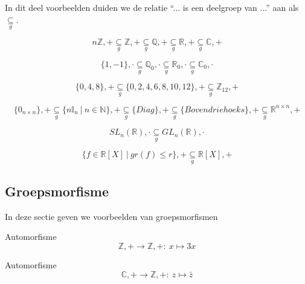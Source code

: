 \documentclass[main.tex]{subfiles}
\begin{document}
In dit deel voorbeelden duiden we de relatie ``... is een deelgroep van ...'' aan als $\underset{g}{\subseteq}$.

\begin{vb}
  \[ n\mathbb{Z},+ \underset{g}{\subseteq} \mathbb{Z},+ \underset{g}{\subseteq} \mathbb{Q},+ \underset{g}{\subseteq} \mathbb{R},+ \underset{g}{\subseteq} \mathbb{C},+ \]
\end{vb}

\begin{vb}
  \[ \{ 1,-1\},\cdot \underset{g}{\subseteq} \mathbb{Q}_{0},\cdot \underset{g}{\subseteq} \mathbb{R}_{0},\cdot \underset{g}{\subseteq} \mathbb{C}_{0},\cdot \]
\end{vb}

\begin{vb}
  \[ \{ 0,4,8\},+ \underset{g}{\subseteq} \{ 0,2,4,6,8,10,12\},+ \underset{g}{\subseteq} \mathbb{Z}_{12},+ \]
\end{vb}

\begin{vb}
  \[ \{0_{n\times n}\},+ \underset{g}{\subseteq} \{ n\mathbb{I}_{n} \ |\ n \in \mathbb{N} \},+ \underset{g}{\subseteq} \{ Diag \},+ \underset{g}{\subseteq} \{ Bovendriehoeks \},+ \underset{g}{\subseteq} \mathbb{R}^{n\times n},+ \]
\end{vb}

\begin{vb}
  \[ SL_{n}(\mathbb{R}),\cdot \underset{g}{\subseteq} GL_{n}(\mathbb{R}),\cdot \]
\end{vb}

\begin{vb}
  \[ \{f \in \mathbb{R}[X] \ |\ gr(f) \le r\},+ \underset{g}{\subseteq} \mathbb{R}[X],+ \]
\end{vb} 

\subsection{Groepsmorfisme}
\label{sec:groepsmorfisme}

In deze sectie geven we voorbeelden van groepsmorfismen

\begin{vb}
  Automorfisme
  \[ \mathbb{Z},+ \rightarrow \mathbb{Z},+:\ x \mapsto 3x \]
\end{vb}

\begin{vb}
  Automorfisme
  \[ \mathbb{C},+ \rightarrow \mathbb{Z},+:\ z \mapsto \bar{z} \]
\end{vb}
\end{document}
